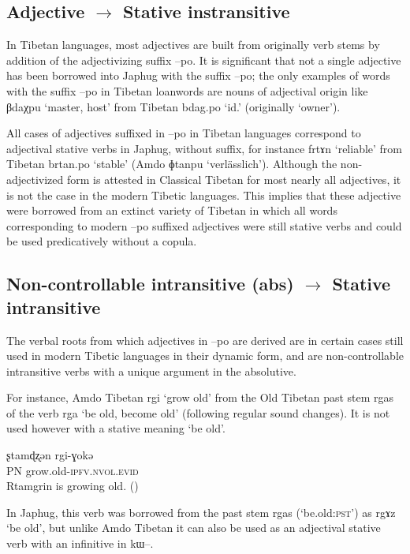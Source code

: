 \documentclass[oldfontcommands,oneside,a4paper,11pt]{article}
\newcommand{\ipa}[1]{{\phon \mbox{#1}}} %
\begin{document}
  \subsection{Adjective $\rightarrow$ Stative instransitive}  
In Tibetan languages, most adjectives are built from originally verb stems by addition of the adjectivizing suffix \ipa{--po}. It is significant that not a single adjective has been borrowed into Japhug with the suffix \ipa{--po}; the only examples of words with the suffix \ipa{--po} in Tibetan loanwords are nouns of adjectival origin like \ipa{βdaχpu} `master, host' from Tibetan \ipa{bdag.po} `id.' (originally `owner').

All cases of adjectives suffixed in \ipa{--po} in Tibetan languages correspond to adjectival stative verbs in Japhug, without suffix, for instance   \ipa{frtɤn} `reliable' from Tibetan \ipa{brtan.po} `stable' (Amdo \ipa{ɸtanpu} `verlässlich'). Although the non-adjectivized form is attested in Classical Tibetan for most nearly all adjectives, it is not the case in the modern Tibetic languages. This implies that these adjective were borrowed from an extinct variety of Tibetan in which all words corresponding to modern \ipa{--po} suffixed adjectives were still stative verbs and could be used predicatively without a copula.

  
\subsection{Non-controllable intransitive (abs) $\rightarrow$ Stative intransitive}
The verbal roots from which adjectives in \ipa{--po} are derived are in certain cases still used in modern Tibetic languages in their dynamic form, and are non-controllable intransitive verbs with a unique argument in the absolutive.

For instance, Amdo Tibetan \ipa{rgi} `grow old' from the Old Tibetan past stem \ipa{rgas} of the verb \ipa{rga} `be old, become old' (following regular sound changes). It is not used however with a stative meaning `be old'.

\begin{exe}
\ex \label{ex:rgi}
\gll
\ipa{ʂtamɖʐən} 	\ipa{rgi-ɣokə}  	 \\
PN grow.old-\textsc{ipfv.nvol.evid} \\
\glt Rtamgrin is growing old. (\citealt[123:548]{haller04themchen})
\end{exe}

In Japhug, this verb was borrowed from the past stem \ipa{rgas} (`be.old:\textsc{pst}') as \ipa{rgɤz} `be old', but unlike Amdo Tibetan it can also be used as an adjectival stative verb with an infinitive in \ipa{kɯ--}. 
\end{document}
